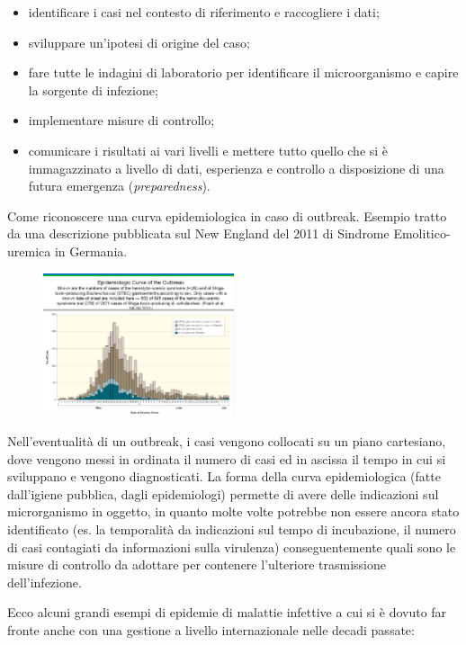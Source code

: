 \begin{itemize}
\item
  identificare i casi nel contesto di riferimento e raccogliere i dati;
\item
  sviluppare un'ipotesi di origine del caso;
\item
  fare tutte le indagini di laboratorio per identificare il
  microorganismo e capire la sorgente di infezione;
\item
  implementare misure di controllo;
\item
  comunicare i risultati ai vari livelli e mettere tutto quello che si è
  immagazzinato a livello di dati, esperienza e controllo a disposizione
  di una futura emergenza (\emph{preparedness}).
\end{itemize}

Come riconoscere una curva epidemiologica in caso di outbreak. Esempio
tratto da una descrizione pubblicata sul New England del 2011 di
Sindrome Emolitico-uremica in Germania.

\begin{figure}[!ht]
\centering
	\includegraphics[width=0.5\textwidth]{26/image9.jpeg}
	\end{figure}

Nell'eventualità di un outbreak, i casi vengono collocati su un piano
cartesiano, dove vengono messi in ordinata il numero di casi ed in
ascissa il tempo in cui si sviluppano e vengono diagnosticati. La forma
della curva epidemiologica (fatte dall'igiene pubblica, dagli
epidemiologi) permette di avere delle indicazioni sul microrganismo in
oggetto, in quanto molte volte potrebbe non essere ancora stato
identificato (es. la temporalità da indicazioni sul tempo di
incubazione, il numero di casi contagiati da informazioni sulla
virulenza) conseguentemente quali sono le misure di controllo da
adottare per contenere l'ulteriore trasmissione dell'infezione.

Ecco alcuni grandi esempi di epidemie di malattie infettive a cui si è
dovuto far fronte anche con una gestione a livello internazionale nelle
decadi passate:

